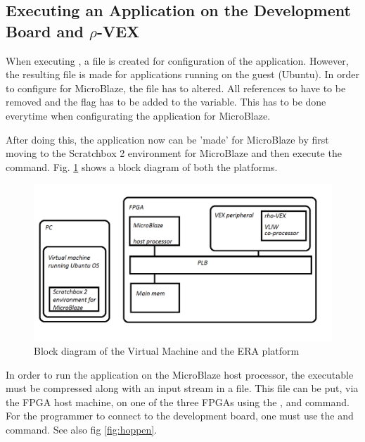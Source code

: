 \subsection{Executing an Application on the Development Board and $\rho$-VEX}

When executing , a file is created for configuration of the application. However, the resulting  file is made for applications running on the guest (Ubuntu). In order to configure for MicroBlaze, the  file has to altered. All references to  have to be removed and the  flag has to be added to the  variable. This has to be done everytime when configurating the application for MicroBlaze.

After doing this, the application now can be 'made' for MicroBlaze by first moving to the Scratchbox 2 environment for MicroBlaze and then execute the  command. Fig. \ref{fig:lelijk} shows a block diagram of both the platforms.

\begin{figure}[htb]%
\includegraphics[width=\columnwidth]{Pictures/Platform_paint}%
\caption{Block diagram of the Virtual Machine and the ERA platform}%
\label{fig:lelijk}%
\end{figure}

In order to run the application on the MicroBlaze host processor, the  executable must be compressed along with an input stream in a  file. This file can be put, via the FPGA host machine, on one of the three FPGAs using the ,  and  command. For the programmer to connect to the development board, one must use the  and  command. See also fig \ref{fig:hoppen}.

